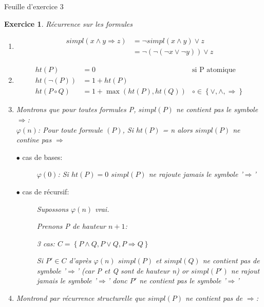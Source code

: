 \documentclass{article}
\theoremstyle{plain}
\newtheorem{exo}{Exercice}%
\begin{document}
\begin{center}
\large\sc Feuille d'exercice 3
\end{center}

\begin{exo} Récurrence sur les formules
\begin{enumerate}
    \item \begin{align*}
        simpl(x \wedge y \Rightarrow z) &= \neg simpl(x \wedge y) \vee z \\
                            &= \neg(\neg(\neg x \vee \neg y)) \vee z
        \end{align*}

    \item \begin{align*}
        ht(P) &= 0   & \text{si P atomique} \\
        ht(\neg(P)) &= 1 + ht(P) \\
        ht(P \circ Q) &= 1 + \max(ht(P), ht(Q)) & \circ \in \left\{\vee, \wedge, \Rightarrow\right\}  
    \end{align*}

    \item Montrons que pour toutes formules P, $simpl(P)$ ne contient pas le symbole $\Rightarrow$:\\
        $\varphi(n)$: Pour toute formule $(P)$, Si $ht(P)$ = n alors $simpl(P)$ ne contine pas $\Rightarrow$

    \begin{description}
        \item[$\bullet$ cas de bases:] $\varphi(0)$: Si $ht(P) = 0$ $simpl(P)$ ne 
        rajoute jamais le symbole '$\Rightarrow$'

        \item[$\bullet$ cas de récursif:] Supossons $\varphi(n)$ vrai.

            Prenons P de hauteur $n + 1$: 
            
            3 cas: $C = \left\{P \wedge Q, P \vee Q, P \Rightarrow Q \right\}$ 

            Si $P' \in C$ d'après $\varphi(n)$ $simpl(P)$ et $simpl(Q)$ ne contient pas
            de symbole '$\Rightarrow$' (car P et Q sont de hauteur n) or $simpl(P')$ ne rajout jamais le symbole '$\Rightarrow$'
            donc $P'$ ne contient pas le symbole '$\Rightarrow$'
    \end{description}

    \item Montrond par récurrence structurelle que $simpl(P)$ ne contient 
    pas de $\Rightarrow$:
    

\end{enumerate}
\end{exo}
\end{document}
